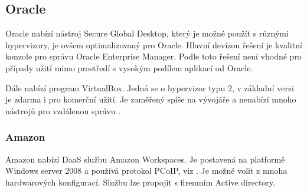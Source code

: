 \subsection{Oracle}
Oracle nabízí nástroj Secure Global Desktop, který je možné použít s různými hypervizory, je ovšem optimalizovaný pro Oracle. Hlavní devízou řešení je kvalitní konzole pro správu Oracle Enterprise Manager. Podle \cite{ForresterWave} toto řešení není vhodné pro případy užití mimo prostředí s vysokým podílem aplikací od Oracle.

Dále nabízí program VirtualBox. Jedná se o hypervizor typu 2, v základní verzi je zdarma i pro komerční užití. Je zaměřený spíše na vývojáře a nenabízí mnoho nástrojů pro vzdálenou správu \cite{OracleVB}.%

\subsubsection{Amazon}

Amazon nabízí DaaS službu Amazon Workspaces. Je postavená na platformě Windows server 2008 a používá protokol PCoIP, viz \cite{AmazonAWS}. Je možné volit z mnoha hardwarových konfigurací. Službu lze propojit s firemním Active directory.
